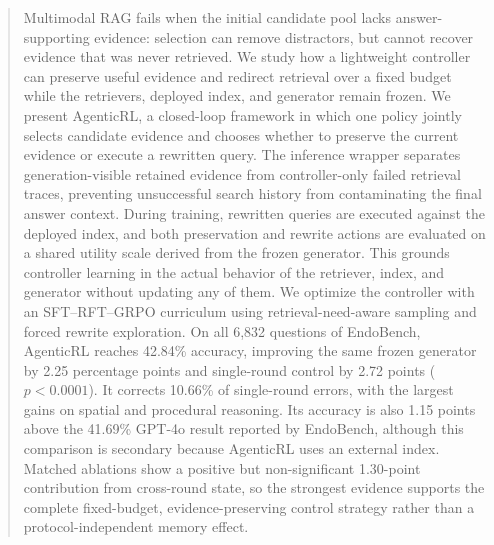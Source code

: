 \begin{abstract}
Multimodal RAG fails when the initial candidate pool lacks answer-supporting
evidence: selection can remove distractors, but cannot recover evidence that
was never retrieved. We study how a lightweight controller can preserve useful
evidence and redirect retrieval over a fixed budget while the retrievers,
deployed index, and generator remain frozen. We present AgenticRL, a
closed-loop framework in which one policy jointly selects candidate evidence
and chooses whether to preserve the current evidence or execute a rewritten
query. The inference wrapper separates generation-visible retained evidence
from controller-only failed retrieval traces, preventing unsuccessful search
history from contaminating the final answer context. During training, rewritten
queries are executed against the deployed index, and both preservation and
rewrite actions are evaluated on a shared utility scale derived from the frozen
generator. This grounds controller learning in the actual behavior of the
retriever, index, and generator without updating any of them. We optimize the
controller with an SFT--RFT--GRPO curriculum using retrieval-need-aware
sampling and forced rewrite exploration. On all 6,832 questions of EndoBench,
AgenticRL reaches 42.84\% accuracy, improving the same frozen generator by
2.25 percentage points and single-round control by 2.72 points
($p<0.0001$). It corrects 10.66\% of single-round errors, with the largest
gains on spatial and procedural reasoning. Its accuracy is also 1.15 points
above the 41.69\% GPT-4o result reported by EndoBench, although this comparison
is secondary because AgenticRL uses an external index. Matched ablations show a
positive but non-significant 1.30-point contribution from cross-round state,
so the strongest evidence supports the complete fixed-budget,
evidence-preserving control strategy rather than a protocol-independent memory
effect.
\end{abstract}
